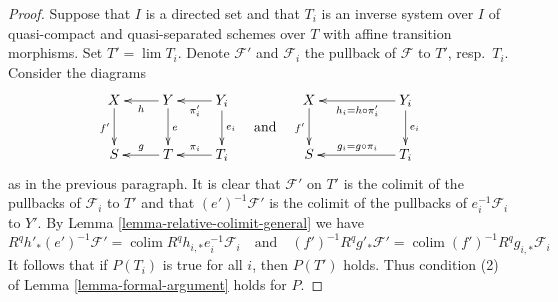 \documentclass[10pt,a4paper]{amsart}
\theoremstyle{plain}
\theoremstyle{definition}
\theoremstyle{remark}
\numberwithin{equation}{subsection}
\def\lim{\mathop{\mathrm{lim}}\nolimits}
\def\colim{\mathop{\mathrm{colim}}\nolimits}
\begin{document}
\begin{proof}
\medskip\noindent
Suppose that $I$ is a directed set and that $T_i$
is an inverse system over $I$ of quasi-compact and quasi-separated
schemes over $T$ with affine transition morphisms.
Set $T' = \lim T_i$. Denote $\mathcal{F}'$ and $\mathcal{F}_i$
the pullback of $\mathcal{F}$ to $T'$, resp.\ $T_i$. Consider
the diagrams
$$
\vcenter{
\xymatrix{
X \ar[d]_{f'} & Y \ar[l]^h \ar[d]^e & Y_i \ar[l]^{\pi_i'} \ar[d]^{e_i} \\
S & T \ar[l]_g & T_i \ar[l]_{\pi_i}
}
}
\quad\text{and}\quad
\vcenter{
\xymatrix{
X \ar[d]_{f'} & & Y_i \ar[ll]^{h_i = h \circ \pi_i'} \ar[d]^{e_i} \\
S & & T_i \ar[ll]_{g_i = g \circ \pi_i}
}
}
$$
as in the previous paragraph. It is clear that $\mathcal{F}'$ on
$T'$ is the colimit of the pullbacks of $\mathcal{F}_i$ to $T'$
and that $(e')^{-1}\mathcal{F}'$ is the colimit of the pullbacks
of $e_i^{-1}\mathcal{F}_i$ to $Y'$.
By Lemma \ref{lemma-relative-colimit-general}
we have
$$
R^qh'_*(e')^{-1}\mathcal{F}' = \colim R^qh_{i, *}e_i^{-1}\mathcal{F}_i
\quad\text{and}\quad
(f')^{-1}R^qg'_*\mathcal{F}' = \colim (f')^{-1}R^qg_{i, *}\mathcal{F}_i
$$
It follows that if $P(T_i)$ is true for all $i$, then
$P(T')$ holds. Thus condition (2) of Lemma \ref{lemma-formal-argument}
holds for $P$.


\end{proof}
\end{document}
